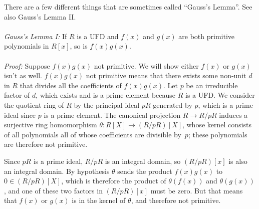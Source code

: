 \documentclass[12pt]{article}
\begin{document}

There are a few different things that are sometimes called ``Gauss's Lemma''. See also Gauss's Lemma II.
\\
\\\emph{Gauss's Lemma I:} If $R$ is a UFD and $f(x)$ and $g(x)$ are both primitive polynomials in $R[x]$, so is $f(x) g(x)$. 
\\
\\ \emph{Proof:} 
Suppose $f(x) g(x)$ not primitive. We will show either $f(x)$ or $g(x)$ isn't as well. $f(x) g(x)$ not primitive means that there exists some non-unit $d$ in $R$ that divides all the coefficients of $f(x) g(x)$. Let $p$ be an irreducible factor of $d$, which exists and is a prime element because $R$ is a UFD. We consider the quotient ring of $R$ by the principal ideal $pR$ generated by $p$, which is a prime ideal since $p$ is a prime element. The canonical projection $R \to R/pR$ induces a surjective ring homomorphism $\theta:R[X]\to(R/pR)[X]$, whose kernel consists of all polynomials all of whose coefficients are divisible by~$p$; these polynomials are therefore not primitive.

Since $pR$ is a prime ideal, $R/pR$ is an integral domain, so $(R/pR)[x]$ is also an integral domain. By hypothesis $\theta$ sends the product $f(x)g(x)$ to $0\in(R/pR)[X]$, which is therefore the product of $\theta(f(x))$ and $\theta(g(x))$, and one of these two factors in $(R/pR)[x]$ must be zero. But that means that $f(x)$ or $g(x)$ is in the kernel of $\theta$, and therefore not primitive.
\end{document}
